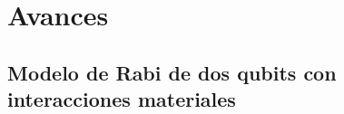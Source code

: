 \documentclass[onecolumn,notitlepage,letterpaper,aps,pra,12pt]{article}
\numberwithin{equation}{section}
\begin{document}

\section{Avances}


\subsection{Modelo de Rabi de dos qubits con interacciones materiales}
\end{document}
